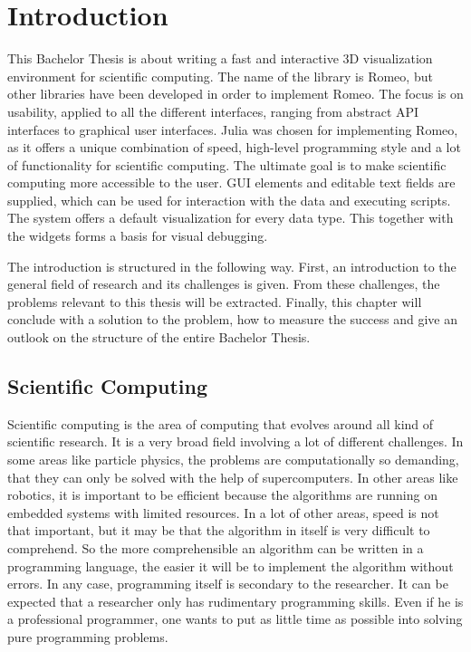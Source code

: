 \section{Introduction}
This Bachelor Thesis is about writing a fast and interactive 3D visualization environment for scientific computing.
The name of the library is Romeo, but other libraries have been developed in order to implement Romeo. 
The focus is on usability, applied to all the different interfaces, ranging from abstract API interfaces to graphical user interfaces. 
Julia was chosen for implementing Romeo, as it offers a unique combination of speed, high-level programming style and a lot of functionality for scientific computing.
The ultimate goal is to make scientific computing more accessible to the user.
\ac{GUI} elements and editable text fields are supplied, which can be used for interaction with the data and executing scripts.
The system offers a default visualization for every data type. This together with the widgets forms a basis for visual debugging.

The introduction is structured in the following way.
First, an introduction to the general field of research and its challenges is given. 
From these challenges, the problems relevant to this thesis will be extracted.
Finally, this chapter will conclude with a solution to the problem, how to measure the success and give an outlook on the structure of the entire Bachelor Thesis.


\subsection{Scientific Computing}

Scientific computing is the area of computing that evolves around all kind of scientific research.
It is a very broad field involving a lot of different challenges. 
In some areas like particle physics, the problems are computationally so demanding, that they can only be solved with the help of supercomputers.
In other areas like robotics, it is important to be efficient because the algorithms are running on embedded systems with limited resources. 
In a lot of other areas, speed is not that important, but it may be that the algorithm in itself is very difficult to comprehend. 
So the more comprehensible an algorithm can be written in a programming language, the easier it will be to implement the algorithm without errors.
In any case, programming itself is secondary to the researcher.
It can be expected that a researcher only has rudimentary programming skills. 
Even if he is a professional programmer, one wants to put as little time as possible into solving pure programming problems.

